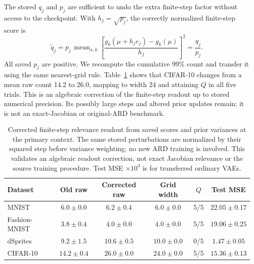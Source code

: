 \documentclass[make,article,submit,pdftex,moreauthors]{Definitions/mdpi}
\begin{document}
The stored $q_j$ and $p_j$ are sufficient to undo the extra finite-step
factor without access to the checkpoint. With $h_j=\sqrt{p_j}$, the
correctly normalized finite-step score is
\begin{equation}
 \widetilde q_j
 =p_j\,\operatorname{mean}_{x,k}
 \left[\frac{g_k(\mu+h_je_j)-g_k(\mu)}{h_j}\right]^2
 =\frac{q_j}{p_j}.
 \label{eq:ardcorrected}
\end{equation}
All saved $p_j$ are positive. We recompute the cumulative 99\% count
and transfer it using the same nearest-grid rule. Table~\ref{tab:ard_normalized}
shows that CIFAR-10 changes from a mean raw count 14.2 to 26.0,
mapping to width 24 and attaining $Q$ in all five trials. This is an
algebraic correction of the finite-step readout up to stored numerical
precision. Its
possibly large steps and altered prior updates remain; it is not
an exact-Jacobian or original-ARD benchmark.
\begin{table}[H]
\caption{Corrected finite-step relevance readout from saved scores and prior variances at the primary context. The same stored perturbations are normalized by their squared step before variance weighting; no new ARD training is involved. This validates an algebraic readout correction, not exact Jacobian relevance or the source training procedure. Test MSE $\times10^3$ is for transferred ordinary VAEs.}\label{tab:ard_normalized}
\small
\setlength{\tabcolsep}{3pt}
\begin{tabular*}{\textwidth}{@{\extracolsep{\fill}}lccccc@{}}
\toprule
Dataset & Old raw & Corrected raw & Grid width & $Q$ & Test MSE \\
\midrule
MNIST & $6.0 \pm 0.0$ & $6.2 \pm 0.4$ & $6.0 \pm 0.0$ & 5/5 & $22.05 \pm 0.17$ \\
Fashion-MNIST & $3.8 \pm 0.4$ & $4.0 \pm 0.0$ & $4.0 \pm 0.0$ & 5/5 & $19.06 \pm 0.25$ \\
dSprites & $9.2 \pm 1.5$ & $10.6 \pm 0.5$ & $10.0 \pm 0.0$ & 0/5 & $1.47 \pm 0.05$ \\
CIFAR-10 & $14.2 \pm 0.4$ & $26.0 \pm 0.0$ & $24.0 \pm 0.0$ & 5/5 & $15.36 \pm 0.13$ \\
\bottomrule\end{tabular*}
\end{table}
\end{document}
